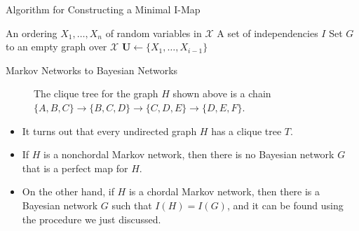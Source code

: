 \documentclass[11pt]{beamer}
\begin{document}
\begin{frame}{Algorithm for Constructing a Minimal I-Map}
\setlength{\topsep}{0pt}
\setlength{\partopsep}{0pt}
\vspace{0pt}
\begin{algorithmic}
\REQUIRE An ordering $X_{1}, \ldots, X_{n}$ of random variables in $\mathcal{X}$
\REQUIRE A set of independencies $I$
\pause
\STATE Set $G$ to an empty graph over $\mathcal{X}$
\pause
{}
	\STATE $\boldsymbol{U} \leftarrow \{X_{1}, \ldots, X_{i-1}\}$
	\pause
		\ENDIF
	\ENDFOR
	\pause
	\ENDFOR
	\pause
\ENDFOR
\end{algorithmic}
\end{frame}

\begin{frame}{Markov Networks to Bayesian Networks}
\setlength{\topsep}{0pt}
\setlength{\partopsep}{0pt}
\vspace{0pt}
\centering
\begin{figure}[!t]
\caption*{\centering\scriptsize The clique tree for the graph $H$ shown above is
a chain $\{A,B,C\} \rightarrow \{B,C,D\} \rightarrow \{C,D,E\} \rightarrow
\{D,E,F\}$.}
\end{figure}
\begin{itemize}
	\item It turns out that every undirected graph $H$ has a clique tree
	$T$.
	\item If $H$ is a nonchordal Markov network, then there is no Bayesian
	network $G$ that is a perfect map for $H$.
	\item On the other hand, if $H$ is a chordal Markov network, then there
	is a Bayesian network $G$ such that $I(H) = I(G)$, and it can be found
	using the procedure we just discussed.
\end{itemize}
\end{frame}
\end{document}
